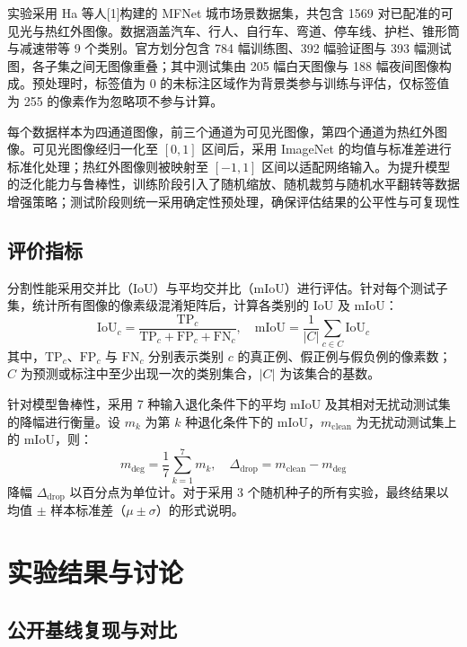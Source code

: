 \documentclass[10pt,conference]{IEEEtran}
\begin{document}
实验采用 Ha 等人[1]构建的 MFNet 城市场景数据集，共包含 1569 对已配准的可见光与热红外图像。数据涵盖汽车、行人、自行车、弯道、停车线、护栏、锥形筒与减速带等 9 个类别。官方划分包含 784 幅训练图、392 幅验证图与 393 幅测试图，各子集之间无图像重叠；其中测试集由 205 幅白天图像与 188 幅夜间图像构成。预处理时，标签值为 0 的未标注区域作为背景类参与训练与评估，仅标签值为 255 的像素作为忽略项不参与计算。

每个数据样本为四通道图像，前三个通道为可见光图像，第四个通道为热红外图像。可见光图像经归一化至 \([0, 1]\) 区间后，采用 ImageNet 的均值与标准差进行标准化处理；热红外图像则被映射至 \([-1, 1]\) 区间以适配网络输入。为提升模型的泛化能力与鲁棒性，训练阶段引入了随机缩放、随机裁剪与随机水平翻转等数据增强策略；测试阶段则统一采用确定性预处理，确保评估结果的公平性与可复现性

\subsection{评价指标}

分割性能采用交并比（IoU）与平均交并比（mIoU）进行评估。针对每个测试子集，统计所有图像的像素级混淆矩阵后，计算各类别的 IoU 及 mIoU：
\begin{equation}
\mathrm{IoU}_{c} = \frac{\mathrm{TP}_{c}}{\mathrm{TP}_{c} + \mathrm{FP}_{c} + \mathrm{FN}_{c}}, \quad \mathrm{mIoU} = \frac{1}{|C|} \sum_{c \in C} \mathrm{IoU}_{c}
\end{equation}
其中，\(\mathrm{TP}_{c}\)、\(\mathrm{FP}_{c}\) 与 \(\mathrm{FN}_{c}\) 分别表示类别 \(c\) 的真正例、假正例与假负例的像素数；\(C\) 为预测或标注中至少出现一次的类别集合，\(|C|\) 为该集合的基数。

针对模型鲁棒性，采用 7 种输入退化条件下的平均 mIoU 及其相对无扰动测试集的降幅进行衡量。设 \(m_{k}\) 为第 \(k\) 种退化条件下的 mIoU，\(m_{\mathrm{clean}}\) 为无扰动测试集上的 mIoU，则：
\begin{equation}
m_{\deg} = \frac{1}{7} \sum_{k=1}^{7} m_{k}, \quad \Delta_{\mathrm{drop}} = m_{\mathrm{clean}} - m_{\deg}
\end{equation}
降幅 \(\Delta_{\mathrm{drop}}\) 以百分点为单位计。对于采用 3 个随机种子的所有实验，最终结果以均值 \(\pm\) 样本标准差（\(\mu \pm \sigma\)）的形式说明。


\section{实验结果与讨论}

\subsection{公开基线复现与对比}
\end{document}
